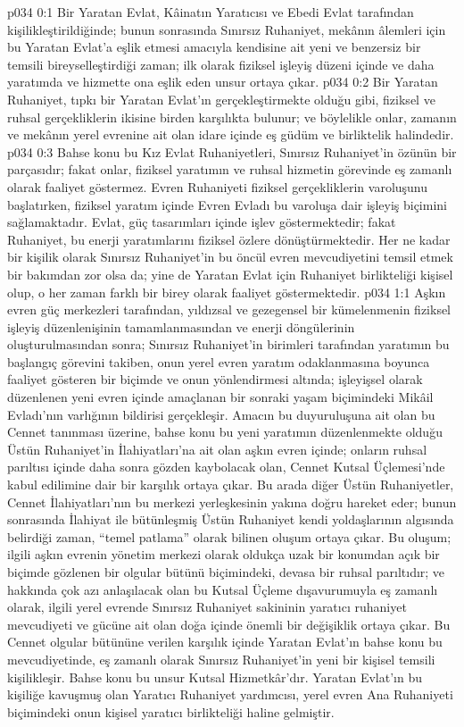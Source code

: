 \vs p034 0:1 Bir Yaratan Evlat, Kâinatın Yaratıcısı ve Ebedi Evlat tarafından kişilikleştirildiğinde; bunun sonrasında Sınırsız Ruhaniyet, mekânın âlemleri için bu Yaratan Evlat’a eşlik etmesi amacıyla kendisine ait yeni ve benzersiz bir temsili bireyselleştirdiği zaman; ilk olarak fiziksel işleyiş düzeni içinde ve daha yaratımda ve hizmette ona eşlik eden unsur ortaya çıkar.
\vs p034 0:2 Bir Yaratan Ruhaniyet, tıpkı bir Yaratan Evlat’ın gerçekleştirmekte olduğu gibi, fiziksel ve ruhsal gerçekliklerin ikisine birden karşılıkta bulunur; ve böylelikle onlar, zamanın ve mekânın yerel evrenine ait olan idare içinde eş güdüm ve birliktelik halindedir.
\vs p034 0:3 Bahse konu bu Kız Evlat Ruhaniyetleri, Sınırsız Ruhaniyet’in özünün bir parçasıdır; fakat onlar, fiziksel yaratımın ve ruhsal hizmetin görevinde eş zamanlı olarak faaliyet göstermez. Evren Ruhaniyeti fiziksel gerçekliklerin varoluşunu başlatırken, fiziksel yaratım içinde Evren Evladı bu varoluşa dair işleyiş biçimini sağlamaktadır. Evlat, güç tasarımları içinde işlev göstermektedir; fakat Ruhaniyet, bu enerji yaratımlarını fiziksel özlere dönüştürmektedir. Her ne kadar bir kişilik olarak Sınırsız Ruhaniyet’in bu öncül evren mevcudiyetini temsil etmek bir bakımdan zor olsa da; yine de Yaratan Evlat için Ruhaniyet birlikteliği kişisel olup, o her zaman farklı bir birey olarak faaliyet göstermektedir.
\vs p034 1:1 Aşkın evren güç merkezleri tarafından, yıldızsal ve gezegensel bir kümelenmenin fiziksel işleyiş düzenlenişinin tamamlanmasından ve enerji döngülerinin oluşturulmasından sonra; Sınırsız Ruhaniyet’in birimleri tarafından yaratımın bu başlangıç görevini takiben, onun yerel evren yaratım odaklanmasına boyunca faaliyet gösteren bir biçimde ve onun yönlendirmesi altında; işleyişsel olarak düzenlenen yeni evren içinde amaçlanan bir sonraki yaşam biçimindeki Mikâil Evladı’nın varlığının bildirisi gerçekleşir. Amacın bu duyuruluşuna ait olan bu Cennet tanınması üzerine, bahse konu bu yeni yaratımın düzenlenmekte olduğu Üstün Ruhaniyet’in İlahiyatları’na ait olan aşkın evren içinde; onların ruhsal parıltısı içinde daha sonra gözden kaybolacak olan, Cennet Kutsal Üçlemesi’nde kabul edilimine dair bir karşılık ortaya çıkar. Bu arada diğer Üstün Ruhaniyetler, Cennet İlahiyatları’nın bu merkezi yerleşkesinin yakına doğru hareket eder; bunun sonrasında İlahiyat ile bütünleşmiş Üstün Ruhaniyet kendi yoldaşlarının algısında belirdiği zaman, “temel patlama” olarak bilinen oluşum ortaya çıkar. Bu oluşum; ilgili aşkın evrenin yönetim merkezi olarak oldukça uzak bir konumdan açık bir biçimde gözlenen bir olgular bütünü biçimindeki, devasa bir ruhsal parıltıdır; ve hakkında çok azı anlaşılacak olan bu Kutsal Üçleme dışavurumuyla eş zamanlı olarak, ilgili yerel evrende Sınırsız Ruhaniyet sakininin yaratıcı ruhaniyet mevcudiyeti ve gücüne ait olan doğa içinde önemli bir değişiklik ortaya çıkar. Bu Cennet olgular bütününe verilen karşılık içinde Yaratan Evlat’ın bahse konu bu mevcudiyetinde, eş zamanlı olarak Sınırsız Ruhaniyet’in yeni bir kişisel temsili kişilikleşir. Bahse konu bu unsur Kutsal Hizmetkâr’dır. Yaratan Evlat’ın bu kişiliğe kavuşmuş olan Yaratıcı Ruhaniyet yardımcısı, yerel evren Ana Ruhaniyeti biçimindeki onun kişisel yaratıcı birlikteliği haline gelmiştir.
